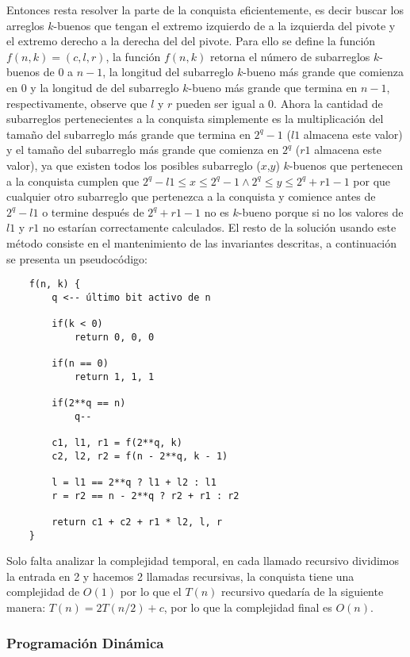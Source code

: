 \documentclass{article}
\begin{document}
Entonces resta resolver la parte de la conquista eficientemente, es decir buscar los arreglos $k$-buenos que tengan el extremo
izquierdo de a la izquierda del pivote y el extremo derecho a la derecha del del pivote. Para ello se define la función $f(n,k)=(c,l,r)$,
la función $f(n,k)$ retorna el número de subarreglos $k$-buenos de 0 a $n-1$, la longitud del subarreglo $k$-bueno más grande
que comienza en 0 y la longitud de del subarreglo $k$-bueno más grande que termina en $n-1$, respectivamente, observe que $l$ y $r$ pueden
ser igual a 0. Ahora la cantidad de subarreglos pertenecientes a la conquista simplemente es la multiplicación del tamaño del
subarreglo más grande que termina en $2^q-1$ ($l1$ almacena este valor) y el tamaño del subarreglo más grande que comienza en $2^q$ ($r1$ almacena este valor), ya que
existen todos los posibles subarreglo ($x$,$y$) $k$-buenos que pertenecen a la conquista cumplen que $2^q-l1\leq x\leq 2^q-1 \wedge 2^q\leq y\leq 2^q+r1-1$
por que cualquier otro subarreglo que pertenezca a la conquista y comience antes de $2^q-l1$ o termine después de $2^q+r1-1$ no es $k$-bueno porque si no los valores de
$l1$ y $r1$ no estarían correctamente calculados. El resto de la solución usando este método consiste en el mantenimiento de las
invariantes descritas, a continuación se presenta un pseudocódigo:

\begin{verbatim}
    f(n, k) {
        q <-- último bit activo de n 

        if(k < 0)
            return 0, 0, 0

        if(n == 0)
            return 1, 1, 1

        if(2**q == n) 
            q--

        c1, l1, r1 = f(2**q, k)
        c2, l2, r2 = f(n - 2**q, k - 1)

        l = l1 == 2**q ? l1 + l2 : l1
        r = r2 == n - 2**q ? r2 + r1 : r2

        return c1 + c2 + r1 * l2, l, r 
    }
\end{verbatim}

Solo falta analizar la complejidad temporal, en cada llamado recursivo dividimos la entrada en 2 y hacemos 2 llamadas recursivas,
la conquista tiene una complejidad de $O(1)$ por lo que el $T(n)$ recursivo quedaría de la siguiente manera: $T(n) = 2T(n/2) + c$,
por lo que la complejidad final es $O(n)$.

\subsubsection{Programación Dinámica}
\end{document}
